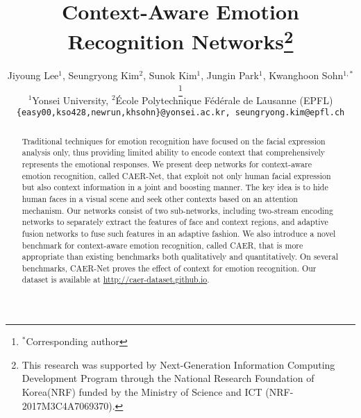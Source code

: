 \documentclass[10pt,twocolumn,letterpaper]{article}
\begin{document}
\title{Context-Aware Emotion Recognition Networks\thanks{This research was supported by Next-Generation Information Computing Development Program through the National Research Foundation of Korea(NRF) funded by the Ministry of Science and ICT (NRF-2017M3C4A7069370).}}
\author{
	Jiyoung Lee$^{1}$, Seungryong Kim$^{2}$, Sunok Kim$^{1}$, Jungin Park$^{1}$, Kwanghoon Sohn$^{1,*}$\thanks{$^{*}$Corresponding author}\\
	$^1$Yonsei University, $^2$\'Ecole Polytechnique F\'ed\'erale de Lausanne (EPFL)\\
	{\tt\small \{easy00,kso428,newrun,khsohn\}@yonsei.ac.kr, seungryong.kim@epfl.ch}\\
}

\maketitle
\ificcvfinal\thispagestyle{empty}\fi


\begin{abstract}
Traditional techniques for emotion recognition have focused on the facial expression analysis only, thus providing limited ability to encode context that comprehensively represents the emotional responses.
We present deep networks for context-aware emotion recognition, called CAER-Net, that exploit not only human facial expression but also context information in a joint and boosting manner.
The key idea is to hide human faces in a visual scene and seek other contexts based on an attention mechanism. Our networks consist of two sub-networks, including two-stream encoding networks to separately extract the features of face and context regions, and adaptive fusion networks to fuse such features in an adaptive fashion. We also introduce a novel benchmark for context-aware emotion recognition, called CAER, that is more appropriate than existing benchmarks both qualitatively and quantitatively.
On several benchmarks, CAER-Net proves the effect of context for emotion recognition.
Our dataset is available at \small{\url{http://caer-dataset.github.io}}.
\end{abstract}
\end{document}
